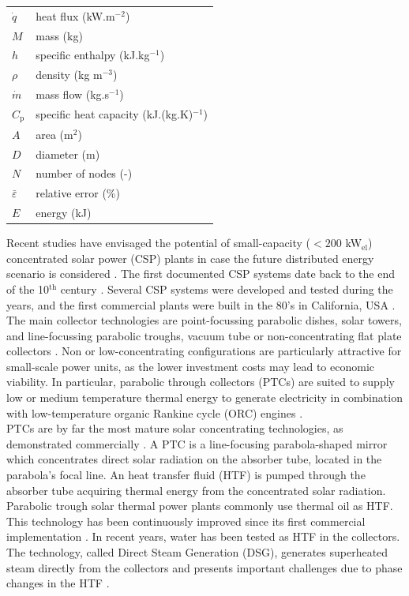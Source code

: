 \documentclass[final,3p,times,review]{elsarticle}
\begin{document}
\begin{table}[h!]
\begin{tabular}{lp{7.5cm}}
$\dot{q}$& heat flux (kW.m$^{-2}$) \\
$M$ & mass (kg)\\
$h$ & specific enthalpy (kJ.kg$^{-1}$)\\
$\rho$ & density (kg m$^{-3}$)\\
$\dot{m}$& mass flow (kg.s$^{-1}$) \\
$ C_\mathrm{p} $& specific heat capacity (kJ.(kg.K)$^{-1}$) \\
$A$ & area (m$^{2}$)\\
$D$ & diameter (m)\\
$N$ & number of nodes (-)\\
$\bar{\varepsilon}$ & relative error (\%)\\
$E$ & energy  (kJ)\\
\end{tabular}
\end{table}
%
Recent studies have envisaged the potential of small-capacity ($<200$ kW$_\mathrm{el}$) concentrated solar power (CSP) plants in case the future distributed energy scenario is considered \cite{Casati2012a,Prabhu2006}. The first documented CSP systems date back to the end of the 10$^\mathrm{th}$ century \cite{Butti_1980}. Several CSP systems were developed and tested during the years, and the first commercial plants were built in the 80's in California, USA \cite{IRENA_CSP_2013}.  The main collector technologies are point-focussing parabolic dishes, solar towers, and line-focussing parabolic troughs, vacuum tube or non-concentrating flat plate collectors \cite{Winter1991}. Non or low-concentrating configurations are particularly attractive for small-scale power units, as the lower investment costs may lead to economic viability. In particular,  parabolic through collectors (PTCs) are suited to supply low or medium temperature thermal energy to generate electricity in combination with low-temperature organic Rankine cycle (ORC) engines \cite{Verneau1978,Angelino1984Areview}.\\

PTCs are by far the most mature solar concentrating technologies, as demonstrated commercially \cite{Fernandez_Garcia2010}. 
 A PTC is a line-focusing  parabola-shaped mirror which concentrates direct solar radiation on the absorber tube, located in the parabola's focal line. An heat transfer fluid (HTF) is pumped through the absorber tube acquiring thermal energy from the concentrated solar radiation. Parabolic trough solar thermal power plants commonly use thermal oil as HTF. This technology has been continuously improved since its first commercial implementation \cite{Canada_Saguaro_2005}. In recent years, water has been tested as HTF in the collectors. The technology, called Direct Steam Generation (DSG),  generates  superheated steam directly from the collectors and presents important challenges due to phase changes in the HTF \cite{Bonilla_MB_2015}.\\
\end{document}
